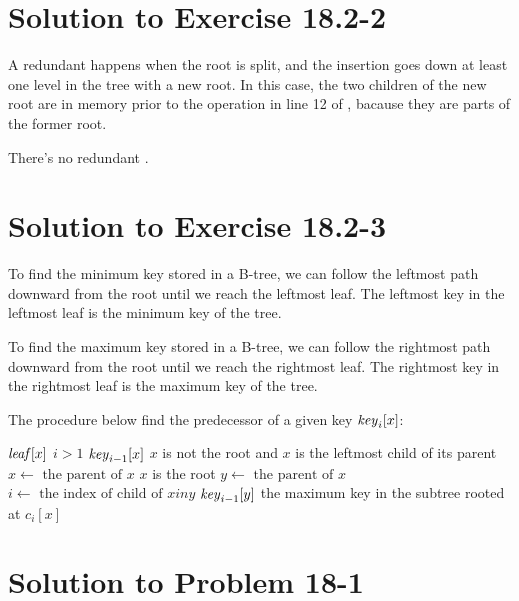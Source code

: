\documentclass[a4paper, fleqn]{article}
\begin{document}
\section*{Solution to Exercise 18.2-2}

A redundant  happens when the root is split, and the
insertion goes down at least one level in the tree with a new root. In
this case, the two children of the new root are in memory prior to the
 operation in line 12 of ,
bacause they are parts of the former root.

There's no redundant .






\section*{Solution to Exercise 18.2-3}

To find the minimum key stored in a B-tree, we can follow the leftmost
path downward from the root until we reach the leftmost leaf. The
leftmost key in the leftmost leaf is the minimum key of the tree.

To find the maximum key stored in a B-tree, we can follow the
rightmost path downward from the root until we reach the rightmost
leaf. The rightmost key in the rightmost leaf is the maximum key of
the tree.

The procedure below find the predecessor of a given key
$\id{key}_i[x]$:

\begin{codebox}
\If $\id{leaf}[x]$
  \Then
    \If $i > 1$
      \Then
        \Return $\id{key}_{i-1}[x]$
      \Else
        \While $x$ is not the root and $x$ is the leftmost child of its parent
          \Do
            $x \gets \mbox{ the parent of } x$
          \End
        \If $x$ is the root
          \Then
            \Return {}
          \Else
            $y \gets \mbox{ the parent of } x$
            $i \gets \mbox{ the index of child of } x { in } y$
            \Return $\id{key}_{i-1}[y]$
          \End
      \End
  \Else
    \Return the maximum key in the subtree rooted at $c_i[x]$
  \End
\end{codebox}






\section*{Solution to Problem 18-1}
\end{document}
